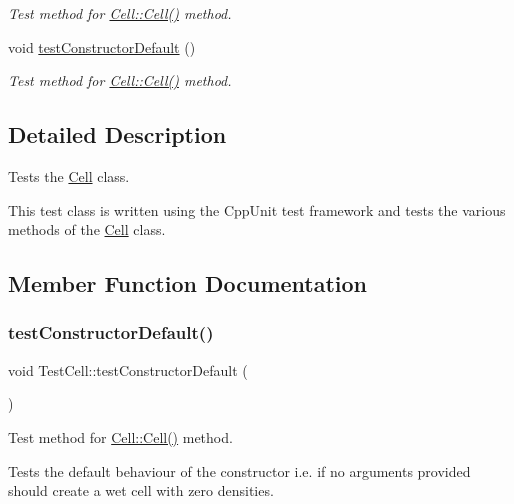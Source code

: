 \begin{DoxyCompactItemize}
\begin{DoxyCompactList}\small\item\em Test method for \hyperlink{class_cell_afc0a4cece64b7689425fa81a4f6ef2e2}{Cell\+::\+Cell()} method. \end{DoxyCompactList}\item 
void \hyperlink{class_test_cell_aba7f3b946d9163abd19050db3204903e}{test\+Constructor\+Default} ()
\begin{DoxyCompactList}\small\item\em Test method for \hyperlink{class_cell_afc0a4cece64b7689425fa81a4f6ef2e2}{Cell\+::\+Cell()} method. \end{DoxyCompactList}\end{DoxyCompactItemize}


\subsection{Detailed Description}
Tests the \hyperlink{class_cell}{Cell} class. 

This test class is written using the Cpp\+Unit test framework and tests the various methods of the \hyperlink{class_cell}{Cell} class. 

\subsection{Member Function Documentation}
\mbox{\label{class_test_cell_aba7f3b946d9163abd19050db3204903e}} 
\subsubsection{\texorpdfstring{test\+Constructor\+Default()}{testConstructorDefault()}}
{\footnotesize\ttfamily void Test\+Cell\+::test\+Constructor\+Default (\begin{DoxyParamCaption}{ }\end{DoxyParamCaption})\hspace{0.3cm}{\ttfamily [protected]}}



Test method for \hyperlink{class_cell_afc0a4cece64b7689425fa81a4f6ef2e2}{Cell\+::\+Cell()} method. 

Tests the default behaviour of the constructor i.\+e. if no arguments provided should create a wet cell with zero densities. \mbox{\label{class_test_cell_a7c80b33b42263cfa22c782ae0bf2384c}} 
